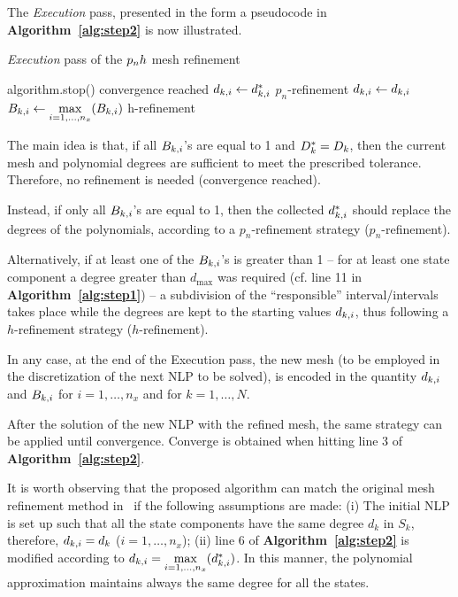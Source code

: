 The \emph{Execution} pass, presented in the form a pseudocode in {\bf Algorithm~\ref{alg:step2}} is now illustrated.
\begin{algorithm}
	\caption{\emph{Execution} pass of the $p_{n}h$ mesh refinement}\label{alg:step2}
	\begin{algorithmic}[1]
			\If {$\Dks = \Dk$}
				\State algorithm.stop() \Comment convergence reached	
			\Else
					\State $d_{k,i} \gets d_{k,i}^{*}$ \Comment ${p_n}$-refinement
				\EndFor
			\EndIf
		\Else
				\State $d_{k,i} \gets d_{k,i}$
				\State $B_{k,i} \gets \max\limits_{i= 1, \dots, n_x}(B_{k,i})$ \Comment h-refinement
			\EndFor		
		\EndIf
	\end{algorithmic}
\end{algorithm}
The main idea is that, if all $B_{k,i}$'s are equal to 1 and $\Dks = \Dk$, then the current mesh and polynomial degrees are sufficient to meet the prescribed tolerance. Therefore, no refinement is needed (convergence reached).

 Instead, if only all $B_{k,i}$'s are equal to 1, then the collected $d_{k,i}^{*}$ should replace the degrees of the polynomials, according to a $p_n$-refinement strategy (${p_n}$-refinement).

Alternatively, if at least one of the $B_{k,i}$'s is greater than 1 -- for at least one state component a degree greater than $d_\text{max}$ was required (cf. line 11 in {\bf Algorithm~\ref{alg:step1}}) -- a subdivision of the ``responsible'' interval/intervals takes place while the degrees are kept to the starting values $d_{k,i}$, thus following a $h$-refinement strategy ($h$-refinement).

In any case, at the end of the Execution pass, the new mesh (to be employed in the discretization of the next NLP to be solved), is encoded in the quantity $d_{k,i}$ and $B_{k,i}$ for $i = 1, \dots, n_x$ and for $k = 1, \dots, N$.

After the solution of the new NLP with the refined mesh, the same strategy can be applied until convergence. Converge is obtained when hitting line 3 of {\bf Algorithm~\ref{alg:step2}}.


It is worth observing that the proposed algorithm can match the original mesh refinement method in~\cite{Patterson:OCAM:2015} if the following assumptions are made: (i) The initial NLP is set up such that all the state components have the same degree $d_k$ in $S_k$, therefore, $d_{k,i} = d_k$ ($i = 1, \dots, n_x$); (ii) line 6 of {\bf Algorithm~\ref{alg:step2}} is modified according to $d_{k,i} = \max\limits_{i= 1, \dots, n_x}(d_{k,i}^{*})$. In this manner, the polynomial approximation maintains always the same degree for all the states.



